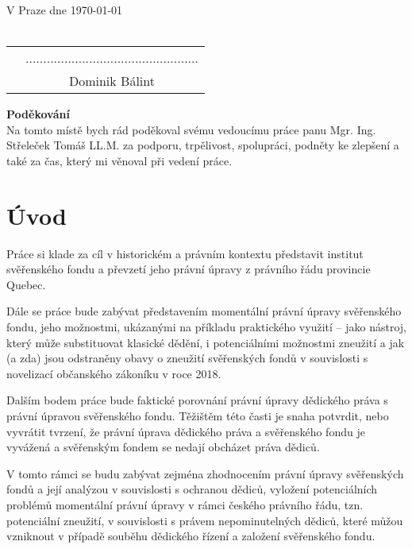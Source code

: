 \documentclass{article}
\begin{document}
\noindent V Praze dne \today \\
\vspace{10mm} \\
\begin{tabular}{p{6cm}c}
& ................................................. \\
& Dominik Bálint
\end{tabular}

\newpage

\thispagestyle{empty}

\vspace*{\fill}
\noindent \textbf{Poděkování} \\

	Na tomto místě bych rád poděkoval svému vedoucímu práce panu Mgr. Ing. 
Střeleček  Tomáš LL.M. za podporu, trpělivost, spolupráci, podněty ke zlepšení a 
také za čas, který mi věnoval při vedení práce.

\vspace*{\fill}
 
\newpage
  \tableofcontents
  
\newpage
  
\section{Úvod}

Práce si klade za cíl v historickém a právním kontextu představit institut svěřenského fondu a převzetí jeho právní úpravy z právního řádu provincie Quebec.
\linebreak

\indent Dále se práce bude zabývat představením momentální právní úpravy svěřens\-kého fondu, jeho možnostmi, ukázanými na příkladu praktického využití – jako nástroj, který může substituovat klasické dědění, i potenciálními možnostmi zneužití a jak (a zda) jsou odstraněny obavy o zneužití svěřenských fondů v souvislosti s novelizací občanského zákoníku v roce 2018. 
\linebreak

\indent Dalším bodem práce bude faktické porovnání právní úpravy dědického práva s právní úpravou svěřenského fondu. Těžištěm této časti je snaha potvrdit, nebo vyvrátit tvrzení, že právní úprava dědického práva a svěřenského fondu je vyvážená a svěřenským fondem se nedají obcházet práva dědiců.
\linebreak

\indent V tomto rámci se budu zabývat zejména zhodnocením právní úpravy svěřens\-kých fondů a její analýzou v souvislosti s ochranou dědiců, vyložení potenciálních problémů momentální právní úpravy v rámci českého právního řádu, tzn. potenciální zneužití, v souvislosti s právem nepominutelných dědiců, které můžou vzniknout v případě souběhu dědického řízení a založení svěřenského fondu.
\linebreak
\end{document}
